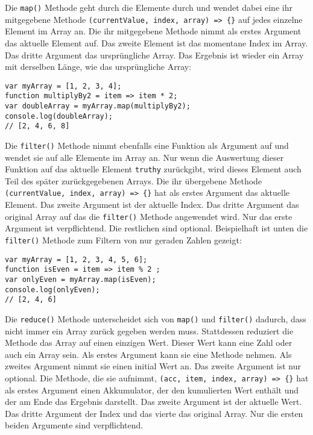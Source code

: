 \documentclass{book}
\begin{document}
Die \lstinline|map()| Methode geht durch die Elemente durch und wendet dabei eine ihr mitgegebene Methode \lstinline|(currentValue, index, array) => {}| auf jedes einzelne Element im Array an. Die ihr mitgegebene Methode nimmt als erstes Argument das aktuelle Element auf. Das zweite Element ist das momentane Index im Array. Das dritte Argument das ursprüngliche Array. Das Ergebnis ist wieder ein Array mit derselben Länge, wie das ursprüngliche Array:

\begin{lstlisting}[caption=Array Konstruktor]
var myArray = [1, 2, 3, 4];
function multiplyBy2 = item => item * 2;
var doubleArray = myArray.map(multiplyBy2);
console.log(doubleArray);
// [2, 4, 6, 8]
\end{lstlisting}

Die \lstinline|filter()| Methode nimmt ebenfalls eine Funktion als Argument auf und wendet sie auf alle Elemente im Array an. Nur wenn die Auswertung dieser Funktion auf das aktuelle Element \lstinline|truthy| zurückgibt, wird dieses Element auch Teil des später zurückgegebenen Arrays. Die ihr übergebene Methode \lstinline|(currentValue, index, array) => {}| hat als erstes Argument das aktuelle Element. Das zweite Argument ist der aktuelle Index. Das dritte Argument das original Array auf das die \lstinline|filter()| Methode angewendet wird. Nur das erste Argument ist verpflichtend. Die restlichen sind optional. Beispielhaft ist unten die \lstinline|filter()| Methode zum Filtern von nur geraden Zahlen gezeigt:

\begin{lstlisting}[caption=Array Konstruktor]
var myArray = [1, 2, 3, 4, 5, 6];
function isEven = item => item % 2 ;
var onlyEven = myArray.map(isEven);
console.log(onlyEven);
// [2, 4, 6]
\end{lstlisting}

Die \lstinline|reduce()| Methode unterscheidet sich von \lstinline|map()| und \lstinline|filter()| dadurch, dass nicht immer ein Array zurück gegeben werden muss. Stattdessen reduziert die Methode das Array auf einen einzigen Wert. Dieser Wert kann eine Zahl oder auch ein Array sein. Als erstes Argument kann sie eine Methode nehmen. Als zweites Argument nimmt sie einen initial Wert an. Das zweite Argument ist nur optional. Die Methode, die sie aufnimmt, \lstinline|(acc, item, index, array) => {}| hat als erstes Argument einen Akkumulator, der den kumulierten Wert enthält und der am Ende das Ergebnis darstellt. Das zweite Argument ist der aktuelle Wert. Das dritte Argument der Index und das vierte das original Array. Nur die ersten beiden Argumente sind verpflichtend.
\end{document}
